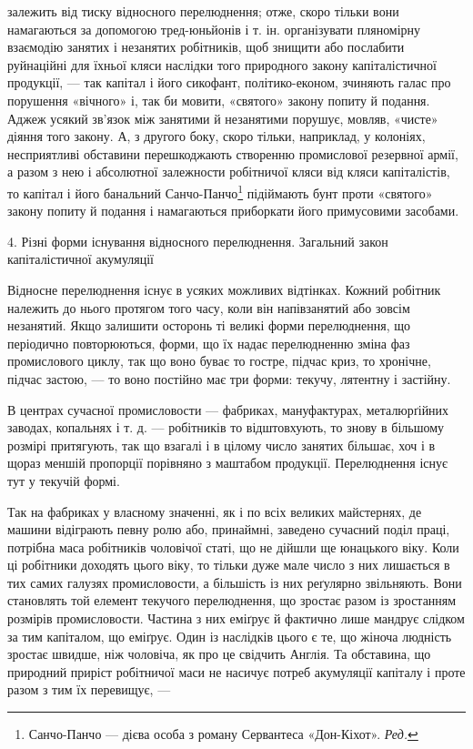 \parcont{}  %
залежить від тиску відносного перелюднення; отже, скоро тільки вони намагаються за допомогою
тред-юньйонів і т. ін. організувати пляномірну взаємодію занятих і незанятих робітників, щоб знищити
або послабити руйнаційні для їхньої кляси наслідки того природного закону капіталістичної продукції,
— так капітал і його сикофант, політико-економ, зчиняють галас про порушення «вічного» і, так би
мовити, «святого» закону попиту й подання. Аджеж усякий зв’язок між занятими й незанятими
порушує, мовляв, «чисте» діяння того закону. А, з другого боку, скоро тільки, наприклад, у колоніях,
несприятливі обставини перешкоджають створенню промислової резервної армії, а разом з нею і
абсолютної залежности робітничої кляси від кляси капіталістів, то капітал і його банальний
Санчо-Панчо\footnote*{
Санчо-Панчо — дієва особа з роману Сервантеса «Дон-Кіхот». \emph{Ред.}
} підіймають
бунт проти «святого» закону попиту й подання і намагаються приборкати його примусовими засобами.

4. Різні форми існування відносного перелюднення. Загальний закон капіталістичної акумуляції

Відносне перелюднення існує в усяких можливих відтінках. Кожний робітник належить до нього протягом
того часу, коли він напівзанятий або зовсім незанятий. Якщо залишити осторонь ті великі форми
перелюднення, що періодично повторюються,
форми, що їх надає перелюдненню зміна фаз промислового циклу, так що воно буває то гостре, підчас
криз, то хронічне, підчас застою, — то воно постійно має три форми: текучу, лятентну і застійну.

В центрах сучасної промисловости — фабриках, мануфактурах, металюрґійних заводах, копальнях і т. д.
— робітників то відштовхують, то знову в більшому розмірі притягують, так що взагалі і в цілому
число занятих більшає, хоч і в щораз
меншій пропорції порівняно з маштабом продукції. Перелюднення існує тут у текучій формі.

Так на фабриках у власному значенні, як і по всіх великих майстернях, де машини відіграють певну
ролю або, принаймні, заведено сучасний поділ праці, потрібна маса робітників чоловічої статі, що не
дійшли ще юнацького віку. Коли ці робітники доходять цього віку, то тільки дуже мале число з них
лишається в тих самих галузях промисловости, а більшість із них реґулярно звільняють. Вони
становлять той елемент текучого перелюднення, що зростає разом із зростанням розмірів промисловости.
Частина з них еміґрує й фактично лише мандрує слідком за тим капіталом, що еміґрує. Один із
наслідків цього є те, що жіноча людність зростає швидше, ніж чоловіча, як про це свідчить Англія. Та
обставина, що природний приріст робітничої маси не насичує
потреб акумуляції капіталу і проте разом з тим їх перевищує, —
\parbreak{}  %
